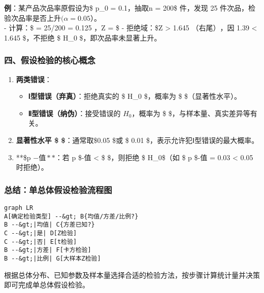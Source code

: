 \textbf{例}：某产品次品率原假设为\$ p\_0 = 0.1\(，抽取\)n = 200\$
件，发现 25 件次品，检验次品率是否上升\(( \alpha = 0.05\)）。\\
- 计算：\$ = 25/200 = 0.125 \(，\)Z =
 \$ -
拒绝域：\$Z \textgreater{} 1.645 \(（右尾），因\) 1.39 \textless{} 1.645
\$，不拒绝 \$ H\_0 \$，即次品率未显著上升。

\hypertarget{ux56dbux5047ux8bbeux68c0ux9a8cux7684ux6838ux5fc3ux6982ux5ff5}{%
\subsubsection{\texorpdfstring{\textbf{四、假设检验的核心概念}}{四、假设检验的核心概念}}\label{ux56dbux5047ux8bbeux68c0ux9a8cux7684ux6838ux5fc3ux6982ux5ff5}}

\begin{enumerate}
\def\labelenumi{\arabic{enumi}.}
\tightlist
\item
  \textbf{两类错误}：

  \begin{itemize}
  \tightlist
  \item
    \textbf{Ⅰ型错误（弃真）}：拒绝真实的 \$ H\_0 \$，概率为 \$
    \alpha\$（显著性水平）。\\
  \item
    \textbf{Ⅱ型错误（纳伪）}：接受错误的 \(H_0\)，概率为 \$
    \beta \$，与样本量、真实差异等有关。\\
  \end{itemize}
\item
  \textbf{显著性水平 \$ \alpha \$}：通常取\$0.05 \$或 \$ 0.01
  \$，表示允许犯Ⅰ型错误的最大概率。\\
\item
  **\$p \(-值**：若\) p \$-值 \textless{} \$ \alpha \$，则拒绝 \$
  H\_0\$（如 \$ p \$-值 = 0.03 \textless{} 0.05 时拒绝）。
\end{enumerate}

\hypertarget{ux603bux7ed3ux5355ux603bux4f53ux5047ux8bbeux68c0ux9a8cux6d41ux7a0bux56fe}{%
\subsubsection{\texorpdfstring{\textbf{总结：单总体假设检验流程图}}{总结：单总体假设检验流程图}}\label{ux603bux7ed3ux5355ux603bux4f53ux5047ux8bbeux68c0ux9a8cux6d41ux7a0bux56fe}}

\begin{verbatim}
graph LR
A[确定检验类型] --&gt; B{均值/方差/比例?}
B --&gt;|均值| C{方差已知?}
C --&gt;|是| D[Z检验]
C --&gt;|否| E[t检验]
B --&gt;|方差| F[卡方检验]
B --&gt;|比例| G[大样本Z检验]
\end{verbatim}

根据总体分布、已知参数及样本量选择合适的检验方法，按步骤计算统计量并决策即可完成单总体假设检验。
